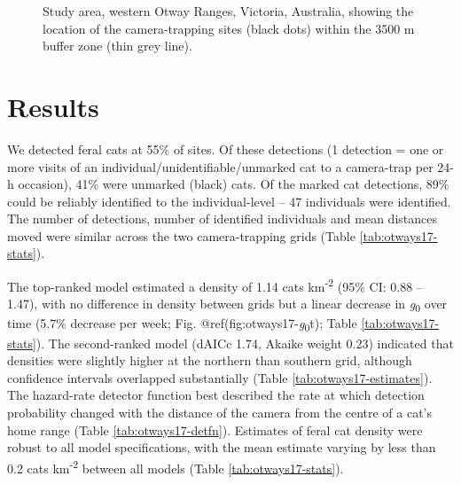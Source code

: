 \documentclass[11pt,a4paper,titlepage,twoside,openright]{style/unimelbthesis}
\begin{document}
\begin{mainmatter}
\begin{figure}
\caption{Study area, western Otway Ranges, Victoria, Australia, showing the location of the camera-trapping sites (black dots) within the 3500 m buffer zone (thin grey line).}\label{fig:otways17-map}
\end{figure}
\newpage

\hypertarget{results-2}{%
\section{Results}\label{results-2}}

We detected feral cats at 55\% of sites. Of these detections (1 detection = one or more visits of an individual/unidentifiable/unmarked cat to a camera-trap per 24-h occasion), 41\% were unmarked (black) cats. Of the marked cat detections, 89\% could be reliably identified to the individual-level -- 47 individuals were identified. The number of detections, number of identified individuals and mean distances moved were similar across the two camera-trapping grids (Table \ref{tab:otways17-stats}).

The top-ranked model estimated a density of 1.14 cats km\textsuperscript{-2} (95\% CI: 0.88 -- 1.47), with no difference in density between grids but a linear decrease in \emph{g}\textsubscript{0} over time (5.7\% decrease per week; Fig. @ref(fig:otways17-\emph{g}\textsubscript{0}t); Table \ref{tab:otways17-stats}). The second-ranked model (dAICc 1.74, Akaike weight 0.23) indicated that densities were slightly higher at the northern than southern grid, although confidence intervals overlapped substantially (Table \ref{tab:otways17-estimates}). The hazard-rate detector function best described the rate at which detection probability changed with the distance of the camera from the centre of a cat's home range (Table \ref{tab:otways17-detfn}). Estimates of feral cat density were robust to all model specifications, with the mean estimate varying by less than 0.2 cats km\textsuperscript{-2} between all models (Table \ref{tab:otways17-stats}).

\newpage

\(~\)

\(~\)


\end{mainmatter}
\end{document}
